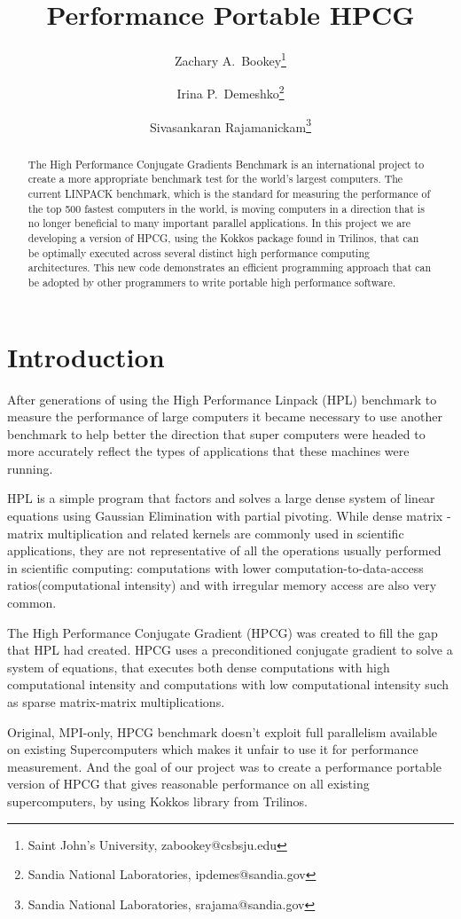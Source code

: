 \documentclass{ccr15}
\title{Performance Portable HPCG}
\author{Zachary A.\ Bookey\thanks{Saint John's University, zabookey@csbsju.edu} \and Irina P.\ Demeshko\thanks{Sandia National Laboratories,
ipdemes@sandia.gov} \and Sivasankaran Rajamanickam\thanks{Sandia National Laboratories, srajama@sandia.gov}}
\begin{document}
\maketitle
\begin{abstract}
The High Performance Conjugate Gradients Benchmark is an international project to create a
more appropriate benchmark test for the world's largest computers. The current LINPACK benchmark,
which is the standard for measuring the performance of the top 500 fastest computers in the
world, is moving computers in a direction that is no longer beneficial to many important
parallel applications. In this project we are developing a version of HPCG, using the Kokkos
package found in Trilinos, that can be optimally executed across several distinct high
performance computing architectures. This new code demonstrates an efficient programming
approach that can be adopted by other programmers to write portable high performance software.
\end{abstract}
\section{Introduction}

After generations of using the High Performance Linpack (HPL) benchmark to measure the
performance of large computers it became necessary to use another benchmark to help better the
direction that super computers were headed to more accurately reflect the types of applications
that these machines were running.

HPL is a simple program that factors and solves a large dense system of linear equations using
Gaussian Elimination with partial pivoting.
While dense matrix - matrix multiplication and related kernels are commonly used in scientific applications,
they are not representative of all the operations usually performed in scientific computing:
computations with lower computation-to-data-access ratios(computational intensity) and with
irregular memory access are also very common.

The High Performance Conjugate Gradient (HPCG) was created to fill the gap that HPL had created.
HPCG uses a preconditioned conjugate gradient to solve a system of equations, that executes both
dense computations with high computational intensity and computations with low computational intensity such as sparse matrix-matrix multiplications.

Original, MPI-only,  HPCG benchmark doesn't exploit full parallelism available on existing Supercomputers which makes it unfair to use it for performance measurement.
And the goal of our project was to create a performance portable version of HPCG that gives reasonable performance on all existing supercomputers, by using Kokkos library from Trilinos.
\end{document}
